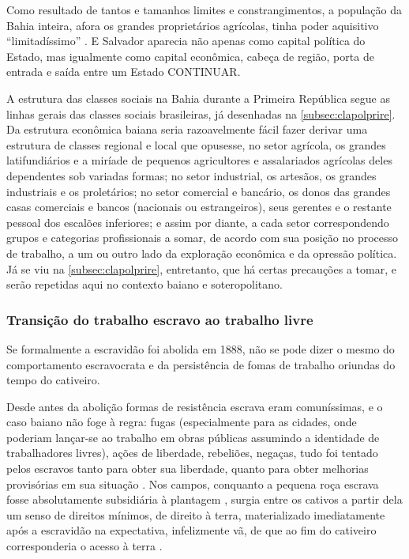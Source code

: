 Como resultado de tantos e tamanhos limites e constrangimentos, a população da Bahia inteira, afora os grandes proprietários agrícolas, tinha poder aquisitivo ``limitadíssimo'' \cite[p.~189]{azevedolins_bancoba_1969}. E Salvador aparecia não apenas como capital política do Estado, mas igualmente como capital econômica, cabeça de região, porta de entrada e saída entre um Estado CONTINUAR.

A estrutura das classes sociais na Bahia durante a Primeira República segue as linhas gerais das classes sociais brasileiras, já desenhadas na \autoref{subsec:clapolprire}. Da estrutura econômica baiana seria razoavelmente fácil fazer derivar uma estrutura de classes regional e local que opusesse, no setor agrícola, os grandes latifundiários e a miríade de pequenos agricultores e assalariados agrícolas deles dependentes sob variadas formas; no setor industrial, os artesãos, os grandes industriais e os proletários; no setor comercial e bancário, os donos das grandes casas comerciais e bancos (nacionais ou estrangeiros), seus gerentes e o restante pessoal dos escalões inferiores; e assim por diante, a cada setor correspondendo grupos e categorias profissionais a somar, de acordo com sua posição no processo de trabalho, a um ou outro lado da exploração econômica e da opressão política. Já se viu na \autoref{subsec:clapolprire}, entretanto, que há certas precauções a tomar, e serão repetidas aqui no contexto baiano e soteropolitano.

\subsubsection{Transição do trabalho escravo ao trabalho livre}\label{subsubsec:traescliv}

Se formalmente a escravidão foi abolida em 1888, não se pode dizer o mesmo do comportamento escravocrata e da persistência de fomas de trabalho oriundas do tempo do cativeiro. 

Desde antes da abolição formas de resistência escrava eram comuníssimas, e o caso baiano não foge à regra: fugas (especialmente para as cidades, onde poderiam lançar-se ao trabalho em obras públicas assumindo a identidade de trabalhadores livres), ações de liberdade, rebeliões, negaças, tudo foi tentado pelos escravos tanto para obter sua liberdade, quanto para obter melhorias provisórias em sua situação \cite[p.~45-52]{fraga_encruzilhadas_2014}. Nos campos, conquanto a pequena roça escrava fosse absolutamente subsidiária à plantagem \cite{gorender_escracolo_2010}, surgia entre os cativos a partir dela um senso de direitos mínimos, de direito à terra, materializado imediatamente após a escravidão na expectativa, infelizmente vã, de que ao fim do cativeiro corresponderia o acesso à terra \cite{fraga_encruzilhadas_2014}.

